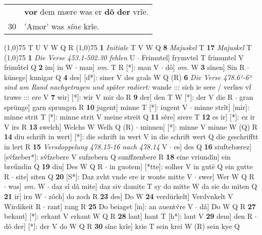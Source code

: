 \documentclass[8pt,a4paper,notitlepage]{article}
\begin{document}
\begin{table}[ht]
\begin{minipage}[t]{0.5\linewidth}
\begin{tabular}{rl}
 & \textbf{vor} dem mære was er \textbf{dô} \textbf{der} vrîe.\\ 
30 & 'Amor' was \textit{sîne} krîe.\\ 
\end{tabular}
\scriptsize
\line(1,0){75} \newline
T U V W Q R \newline
\line(1,0){75} \newline
\textbf{1} \textit{Initiale} T V W Q  \textbf{8} \textit{Majuskel} T  \textbf{17} \textit{Majuskel} T  \newline
\line(1,0){75} \newline
\textbf{1} \textit{Die Verse 453.1-502.30 fehlen} U   $\cdot$ Frimutel] frymvtel T frimuntel V friműtel Q \textbf{2} im] in W  $\cdot$ man] \textit{om.} T R [*]: man V  $\cdot$ dô] \textit{om.} W \textbf{3} sînen] Sin R  $\cdot$ künege] kunigar Q \textbf{4} des] [d*]: siner V des grals W Q (R) \textbf{6} \textit{Die Verse 478.6¹-6² sind am Rand nachgetragen und später radiert:} wande ::: sich ie sere / verlies vf truwe ::: ere V  \textbf{7} wir] [*]: wir V mir do R \textbf{9} der] den T W [*]: der V die R  $\cdot$ gran sprünge] garn sprungen R \textbf{10} jugent] minne T [*]: iugent V  $\cdot$ minne strît] [mir]: minne strit T [*]: minne strit V meine streit Q \textbf{11} sêre] srere T \textbf{12} es ir] [*]: ez ir V irs R \textbf{13} swelch] Welchs W Welh Q (R)  $\cdot$ minnen] [*]: minne V minne W (Q) R \textbf{14} diu schrift in wert] [*]: die schrift in wert V in die schrift wert Q die geschrifftt in lert R \textbf{15} \textit{Versdoppelung 478.15-16 nach 478.14} V   $\cdot$ es] des Q \textbf{16} siuftebærez] [sv́fzeber*]: sv́fzebere V sufzebern Q sunffzenbere R \textbf{18} eine vriundîn] ein breűndin Q \textbf{19} diu] Des W Q R  $\cdot$ in guotem] [*tte]: solher V in gutē Q ein gutte R  $\cdot$ site] siten Q \textbf{20} [S*]: Daz zvht vnde ere ir wonte mitte V  $\cdot$ swer] Wer W Q R  $\cdot$ was] \textit{om.} W  $\cdot$ daz sî dâ mite] daz siv damite T sy do mitte W da sie do miten Q \textbf{21} ir] irn W  $\cdot$ zôch] do zoch R \textbf{23} des] Do W \textbf{24} verdürkelt] Verdvnkelt V Wirdikeit R  $\cdot$ rant] rang R \textbf{25} Do beiaget [in]: an auentv́re V  $\cdot$ dâ] Do W Q R \textbf{27} bekant] [*]: erkant V erkant W Q R \textbf{28} lant] hant T [h*]: lant V \textbf{29} dem] den R  $\cdot$ dô der] [*]: der V do W Q R \textbf{30} sîne krîe] krie T sein krei W (R) sein kye Q \newline
\end{minipage}
\end{table}
\end{document}
